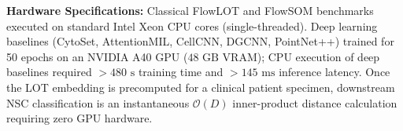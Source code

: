 \documentclass[10pt]{article}
\begin{document}
\begin{table}[p]
\vspace{5pt}
\begin{minipage}{0.98\textwidth}
\footnotesize
\textbf{Hardware Specifications:} Classical FlowLOT and FlowSOM benchmarks executed on standard Intel Xeon CPU cores (single-threaded). Deep learning baselines (CytoSet, AttentionMIL, CellCNN, DGCNN, PointNet++) trained for 50 epochs on an NVIDIA A40 GPU ($48\text{ GB}$ VRAM); CPU execution of deep baselines required $>480\text{ s}$ training time and $>145\text{ ms}$ inference latency. Once the LOT embedding is precomputed for a clinical patient specimen, downstream NSC classification is an instantaneous $\mathcal{O}(D)$ inner-product distance calculation requiring zero GPU hardware.
\end{minipage}
\end{table}
\end{document}
